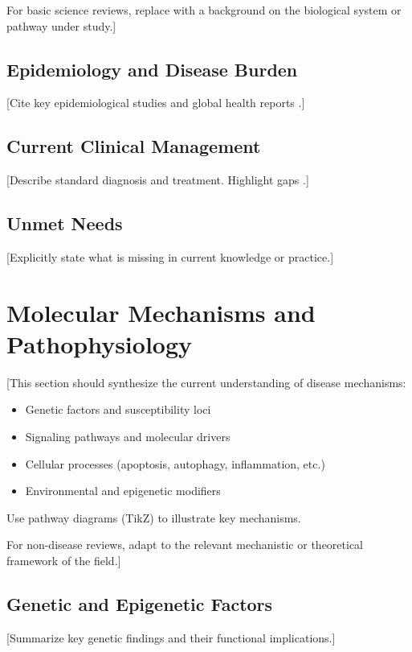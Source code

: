 \documentclass[11pt,a4paper]{article}
\begin{document}
For basic science reviews, replace with a background on the biological
system or pathway under study.]

\subsection{Epidemiology and Disease Burden}
[Cite key epidemiological studies and global health reports \citep{globalburden2023}.]

\subsection{Current Clinical Management}
[Describe standard diagnosis and treatment. Highlight gaps \citep{guidelines2024}.]

\subsection{Unmet Needs}
[Explicitly state what is missing in current knowledge or practice.]

\section{Molecular Mechanisms and Pathophysiology}
[This section should synthesize the current understanding of disease mechanisms:
\begin{itemize}
    \item Genetic factors and susceptibility loci \citep{gwas2024}
    \item Signaling pathways and molecular drivers \citep{pathway2023}
    \item Cellular processes (apoptosis, autophagy, inflammation, etc.)
    \item Environmental and epigenetic modifiers
\end{itemize}

Use pathway diagrams (TikZ) to illustrate key mechanisms.

For non-disease reviews, adapt to the relevant mechanistic or theoretical
framework of the field.]

\subsection{Genetic and Epigenetic Factors}
[Summarize key genetic findings and their functional implications.]
\end{document}
